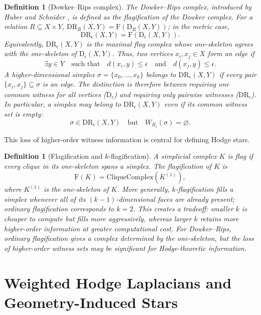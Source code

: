 \documentclass[11pt]{amsart}
\theoremstyle{plain}
\newtheorem{definition}[theorem]{Definition}
\newcommand{\Dow}{\mathrm{D}}
\newcommand{\DR}{\mathrm{DR}}
\newcommand{\Flag}{\mathrm{F}}
\begin{document}
\begin{definition}[Dowker--Rips complex]
The Dowker--Rips complex, introduced by Huber and Schnider \cite{huber2025flagifying}, is defined
as the flagification of the Dowker complex. For a relation $R\subseteq X\times Y$,
$\DR_R(X,Y)=\Flag(\Dow_R(X,Y))$; in the metric case,
\[
\DR_\epsilon(X,Y)
=
\Flag(\Dow_\epsilon(X,Y)).
\]
Equivalently, $\DR_\epsilon(X,Y)$ is the maximal flag complex whose one-skeleton agrees with the
one-skeleton of $\Dow_\epsilon(X,Y)$. Thus, two vertices $x_i,x_j\in X$ form an edge if
\[
\exists y\in Y
\quad\text{such that}\quad
d(x_i,y)\leq \epsilon
\quad\text{and}\quad
d(x_j,y)\leq \epsilon.
\]
A higher-dimensional simplex $\sigma=\{x_0,\dots,x_k\}$ belongs to $\DR_\epsilon(X,Y)$ if every
pair $\{x_i,x_j\}\subseteq \sigma$ is an edge. The distinction is therefore between requiring one
common witness for all vertices ($\Dow_\epsilon$) and requiring only pairwise witnesses
($\DR_\epsilon$). In particular, a simplex may belong to $\DR_\epsilon(X,Y)$ even if its common
witness set is empty:
\[
\sigma\in \DR_\epsilon(X,Y)
\quad\text{but}\quad
W_{R_\epsilon}(\sigma)=\varnothing.
\]
\end{definition}

This loss of higher-order witness information is central for defining Hodge stars.

\begin{definition}[Flagification and \texorpdfstring{$k$}{k}-flagification]
A simplicial complex $K$ is flag if every clique in its one-skeleton spans a simplex. The
flagification of $K$ is
\[
\Flag(K)=\mathrm{CliqueComplex}(K^{(1)}),
\]
where $K^{(1)}$ is the one-skeleton of $K$. More generally, $k$-flagification fills a simplex
whenever all of its $(k-1)$-dimensional faces are already present; ordinary flagification
corresponds to $k=2$. This creates a tradeoff: smaller $k$ is cheaper to compute but fills more
aggressively, whereas larger $k$ retains more higher-order information at greater computational
cost. For Dowker--Rips, ordinary flagification gives a complex determined by the one-skeleton, but
the loss of higher-order witness sets may be significant for Hodge-theoretic information.
\end{definition}

\section{Weighted Hodge Laplacians and Geometry-Induced Stars}
\label{sec:laplacian}
\label{sec:constructions}
\end{document}
